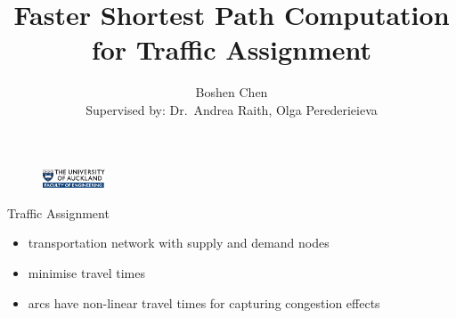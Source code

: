 \documentclass{beamer}
\author[Boshen Chen]{Boshen Chen \\{\small Supervised by: Dr.\ Andrea Raith, Olga Perederieieva}}
\title[Faster Shortest Path Computation for Traffic Assignment]{Faster Shortest Path Computation for Traffic Assignment}
\institute[UoA]{
    Department of Engineering Science\\
    University of Auckland\\
}
\date{}
\begin{document}
\begin{frame}[plain]
    \titlepage
    \begin{figure}
    \raggedleft
    \includegraphics[width=5em,keepaspectratio]{img/logo}
    \end{figure}
\end{frame}


\begin{frame}{Traffic Assignment}
    \begin{itemize}
        \item transportation network with supply and demand nodes
        \item minimise travel times
        \item arcs have non-linear travel times for capturing congestion effects
    \end{itemize}

\end{frame}
\end{document}
